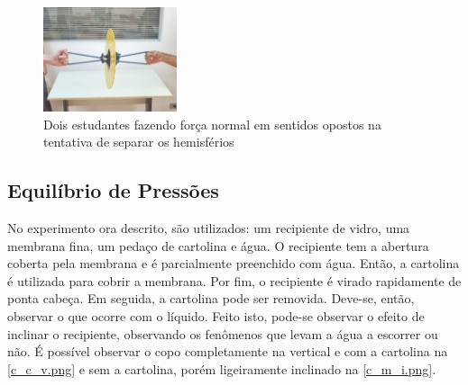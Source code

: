 \begin{figure}[H]
    \centering
    \includegraphics[width=0.35\textwidth]{fig/Cortada.jpeg}
    \caption{Dois estudantes fazendo força normal em sentidos opostos na tentativa de separar os hemisférios}
    \label{foto_hemisferio.png}
\end{figure}


\subsection{Equilíbrio de Pressões}
    No experimento ora descrito, são utilizados: um recipiente de vidro, uma membrana fina, um pedaço de cartolina e água. O recipiente tem a abertura coberta pela membrana e é parcialmente preenchido com água. Então, a cartolina é utilizada para cobrir a membrana. Por fim, o recipiente é virado rapidamente de ponta cabeça. Em seguida, a cartolina pode ser removida. Deve-se, então, observar o que ocorre com o líquido. Feito isto, pode-se observar o efeito de inclinar o recipiente, observando os fenômenos que levam a água a escorrer ou não. É possível observar o copo completamente na vertical e com a cartolina na \cref{c_c_v.png} e sem a cartolina, porém ligeiramente inclinado na \cref{c_m_i.png}.

